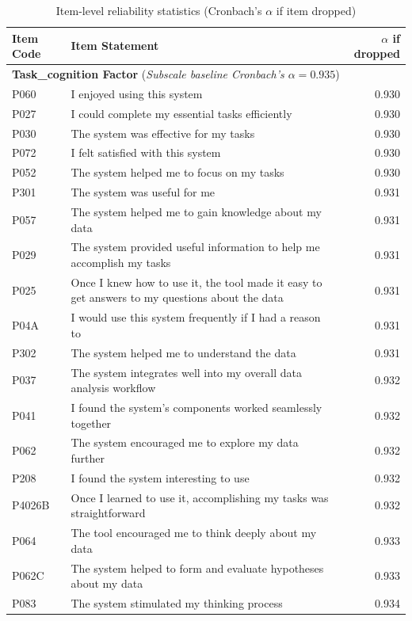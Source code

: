 \begin{table}[ht]
\centering
\caption{Item-level reliability statistics (Cronbach's $\alpha$ if item dropped)}
\label{tab:item-drop}
\begin{tabular}{llr}
\hline
\textbf{Item Code} & \textbf{Item Statement} & \textbf{$\alpha$ if dropped} \\ \hline
\multicolumn{3}{l}{\textbf{Task\_cognition Factor} (\textit{Subscale baseline Cronbach's $\alpha = 0.935$})} \\
P060 & I enjoyed using this system & 0.930 \\
P027 & I could complete my essential tasks efficiently & 0.930 \\
P030 & The system was effective for my tasks & 0.930 \\
P072 & I felt satisfied with this system & 0.930 \\
P052 & The system helped me to focus on my tasks & 0.930 \\
P301 & The system was useful for me & 0.931 \\
P057 & The system helped me to gain knowledge about my data & 0.931 \\
P029 & The system provided useful information to help me accomplish my tasks & 0.931 \\
P025 & Once I knew how to use it, the tool made it easy to get answers to my questions about the data & 0.931 \\
P04A & I would use this system frequently if I had a reason to & 0.931 \\
P302 & The system helped me to understand the data & 0.931 \\
P037 & The system integrates well into my overall data analysis workflow & 0.932 \\
P041 & I found the system's components worked seamlessly together & 0.932 \\
P062 & The system encouraged me to explore my data further & 0.932 \\
P208 & I found the system interesting to use & 0.932 \\
P4026B & Once I learned to use it, accomplishing my tasks was straightforward & 0.932 \\
P064 & The tool encouraged me to think deeply about my data & 0.933 \\
P062C & The system helped to form and evaluate hypotheses about my data & 0.933 \\
P083 & The system stimulated my thinking process & 0.934 \\ \hline

\end{tabular}
\end{table}
